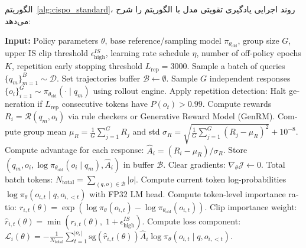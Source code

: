 الگوریتم~\ref{alg:cispo_standard}، روند اجرایی یادگیری تقویتی مدل با الگوریتم  را شرح می‌دهد:

\begin{latin}
\begin{algorithm}[H]
\caption{Clipped IS-weight Policy Optimization (CISPO)}
\label{alg:cispo_standard}
\begin{algorithmic}[1]
\State \textbf{Input:} Policy parameters $\theta$, base reference/sampling model $\pi_{\theta_{\text{old}}}$, group size $G$, upper IS clip threshold $\epsilon_{\text{high}}^{IS}$, learning rate schedule $\eta$, number of off-policy epochs $K$, repetition early stopping threshold $L_{\text{rep}} = 3000$.
    \State Sample a batch of queries $\{q_m\}_{m=1}^B \sim \mathcal{D}$.
    \State Set trajectories buffer $\mathcal{B} \leftarrow \emptyset$.
        \State Sample $G$ independent responses $\{o_i\}_{i=1}^G \sim \pi_{\theta_{\text{old}}}(\cdot \mid q_m)$ using rollout engine.
        \State Apply repetition detection: Halt generation if $L_{\text{rep}}$ consecutive tokens have $P(o_t) > 0.99$.
        \State Compute rewards $R_i = \mathcal{R}(q_m, o_i)$ via rule checkers or Generative Reward Model (GenRM).
        \State Compute group mean $\mu_R = \frac{1}{G}\sum_{j=1}^G R_j$ and std $\sigma_R = \sqrt{\frac{1}{G}\sum_{j=1}^G (R_j - \mu_R)^2} + 10^{-8}$.
        \State Compute advantage for each response: $\hat{A}_i = (R_i - \mu_R) / \sigma_R$.
        \State Store $(q_m, o_i, \log \pi_{\theta_{\text{old}}}(o_i \mid q_m), \hat{A}_i)$ in buffer $\mathcal{B}$.
    \EndFor
        \State Clear gradients: $\nabla_\theta \mathcal{J} \leftarrow 0$.
        \State Total batch tokens: $N_{\text{total}} = \sum_{(q, o) \in \mathcal{B}} |o|$.
            \State Compute current token log-probabilities $\log \pi_\theta(o_{i,t} \mid q, o_{i,<t})$ with FP32 LM head.
            \State Compute token-level importance ratio: $r_{i,t}(\theta) = \exp\left( \log \pi_\theta(o_{i,t}) - \log \pi_{\theta_{\text{old}}}(o_{i,t}) \right)$.
            \State Clip importance weight: $\hat{r}_{i,t}(\theta) = \min\left( r_{i,t}(\theta), \; 1 + \epsilon_{\text{high}}^{IS} \right)$.
            \State Compute loss component: 
            \State \quad $\mathcal{L}_i(\theta) = - \frac{1}{N_{\text{total}}} \sum_{t=1}^{|o_i|} \text{sg}\left(\hat{r}_{i,t}(\theta)\right) \hat{A}_i \log \pi_\theta(o_{i,t} \mid q, o_{i,<t})$.

\end{algorithmic}
\end{algorithm}
\end{latin}
